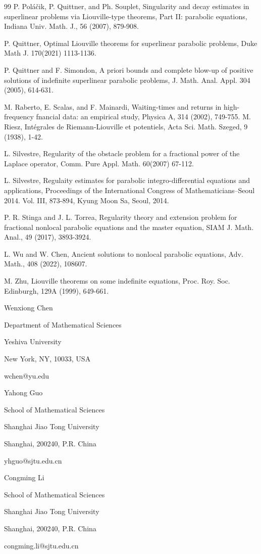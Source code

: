 \documentclass[12pt]{article}
\theoremstyle{remark}
\numberwithin{equation}{section}
\begin{document}
\begin{thebibliography}{99}
P. Pol\'{a}\v{c}ik, P. Quittner, and Ph. Souplet, Singularity and decay estimates in superlinear problems via
Liouville-type theorems, Part II: parabolic equations, Indiana Univ. Math. J., 56 (2007), 879-908.

 P. Quittner, Optimal Liouville theorems for superlinear parabolic problems, Duke Math J. 170(2021) 1113-1136.

  P. Quittner and F. Simondon, A priori bounds and complete blow-up of positive solutions of indefinite superlinear parabolic problems, J. Math. Anal. Appl. 304 (2005), 614-631.

 M. Raberto, E. Scalas, and F. Mainardi, Waiting-times and returns in high-frequency fnancial data: an empirical study, Physica A, 314 (2002), 749-755.
 M. Riesz, Int\'{e}grales de Riemann-Liouville et potentiels, Acta Sci. Math. Szeged, 9 (1938), 1-42.

 L. Silvestre, Regularity of the obstacle problem for
a fractional power of the Laplace operator, Comm. Pure Appl. Math. 60(2007) 67-112.

 L. Silvestre, Regulaity estimates for parabolic integro-differential equations and applications, Proceedings of the International Congress of Mathematicians--Seoul 2014. Vol. III, 873-894, Kyung Moon Sa, Seoul, 2014.


 P. R. Stinga and J. L. Torrea, Regularity theory and extension problem for fractional nonlocal parabolic equations and the master equation, SIAM J. Math. Anal., 49 (2017), 3893-3924.



 L. Wu and W. Chen, Ancient solutions to nonlocal parabolic equations, Adv. Math., 408 (2022), 108607.

 M. Zhu, Liouville theorems on some indefinite equations, Proc. Roy.
Soc. Edinburgh, 129A (1999), 649-661.


\end{thebibliography}
\bigskip

Wenxiong Chen

Department of Mathematical Sciences

Yeshiva University

New York, NY, 10033, USA

wchen@yu.edu
\medskip

Yahong Guo

School of Mathematical Sciences

Shanghai Jiao Tong University

Shanghai, 200240, P.R. China

yhguo@sjtu.edu.cn
\medskip



Congming Li

School of Mathematical Sciences

Shanghai Jiao Tong University

Shanghai, 200240, P.R. China

congming.li@sjtu.edu.cn
\end{document}
